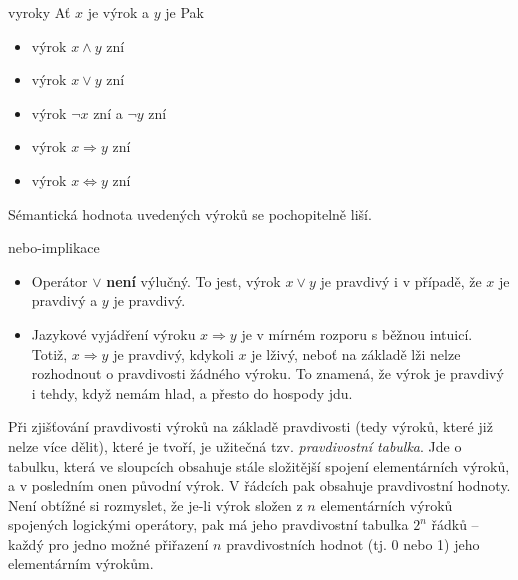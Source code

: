 \begin{example}{}{vyroky}
 Ať $x$ je výrok  a $y$ je  Pak
 \begin{itemize}
  \item výrok $x \wedge y$ zní 
  \item výrok $x \vee y$ zní 
  \item výrok $\neg x$ zní  a $\neg y$ zní 
  \item výrok $x \Rightarrow y$ zní 
  \item výrok $x \Leftrightarrow y$ zní 
 \end{itemize}
 Sémantická hodnota uvedených výroků se pochopitelně liší.
\end{example}
\begin{warning}{}{nebo-implikace}
 \vspace{-\parskip}
 \begin{itemize}
  \item Operátor $ \vee $ \textbf{není} výlučný. To jest, výrok $x \vee y$ je
   pravdivý i v případě, že $x$ je pravdivý a $y$ je pravdivý.
  \item Jazykové vyjádření výroku $x \Rightarrow y$ je v mírném rozporu s běžnou
   intuicí. Totiž, $x \Rightarrow y$ je pravdivý, kdykoli $x$ je lživý, neboť na
   základě lži nelze rozhodnout o pravdivosti žádného výroku. To znamená, že
   výrok  je pravdivý i tehdy, když nemám
   hlad, a přesto do hospody jdu.
 \end{itemize}
\end{warning}

Při zjišťování pravdivosti výroků na základě pravdivosti  (tedy výroků, které již nelze více dělit), které je tvoří, je užitečná
tzv. \emph{pravdivostní tabulka}. Jde o tabulku, která ve sloupcích obsahuje
stále složitější spojení elementárních výroků, a v posledním onen původní výrok.
V řádcích pak obsahuje pravdivostní hodnoty. Není obtížné si rozmyslet, že je-li
výrok složen z $n$ elementárních výroků spojených logickými operátory, pak má
jeho pravdivostní tabulka $2^{n}$ řádků -- každý pro jedno možné přiřazení $n$
pravdivostních hodnot (tj. 0 nebo 1) jeho elementárním výrokům.

